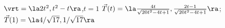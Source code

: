 {$\vrt = \la 2t^2,t^2-t\ra$,\quad $t=1$\label{11_04_ex_05}
}
{$\vec T(t) = \la\frac{4 t}{\sqrt{20 t^2-4t+1}},\frac{2 t-1}{\sqrt{20 t^2-4t+1}}\ra$;
$\vec T(1) = \la 4/\sqrt{17},1/\sqrt{17}\ra$
}